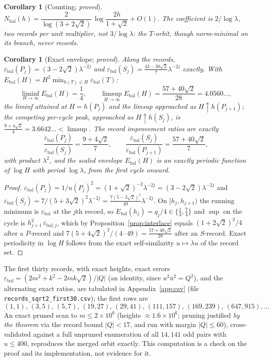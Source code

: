 \documentclass[11pt]{article}
\newtheorem{corollary}[theorem]{Corollary}
\theoremstyle{definition}
\theoremstyle{remark}
\newcommand{\eb}{\varepsilon_{\mathrm{bal}}}
\newcommand{\lam}{\lambda}
\begin{document}
\begin{corollary}[Counting; \emph{proved}]\label{cor:count}
$N_{\mathrm{bal}}(h)=\dfrac{2}{\log(3+2\sqrt2)}\,\log\dfrac{2h}{1+\sqrt2}+O(1)$.
The coefficient is $2/\log\lam$, two records per unit multiplier, not $3/\log\lam$: the $T$-orbit, though norm-minimal on its branch, never records.
\end{corollary}

\begin{corollary}[Exact envelope; \emph{proved}]\label{cor:envelope}
Along the records, $\eb(P_j)=(3-2\sqrt2)\lam^{-2j}$ and $\eb(S_j)=\frac{43-30\sqrt2}{7}\lam^{-2j}$ exactly. With
$E_{\mathrm{bal}}(H)=H^2\min_{h(T)\le H}\eb(T)$:
\[
\liminf_{H\to\infty}E_{\mathrm{bal}}(H)=\frac14,
\qquad
\limsup_{H\to\infty}E_{\mathrm{bal}}(H)=\frac{57+40\sqrt2}{28}=4.0560\dots,
\]
the liminf attained at $H=h(P_j)$ and the limsup approached as $H\uparrow h(P_{j+1})$; the competing per-cycle peak, approached as $H\uparrow h(S_j)$, is $\frac{9+4\sqrt2}{4}=3.6642\dots<\limsup$. The record improvement ratios are exactly
\[
\frac{\eb(P_j)}{\eb(S_j)}=\frac{9+4\sqrt2}{7},
\qquad
\frac{\eb(S_j)}{\eb(P_{j+1})}=\frac{57+40\sqrt2}{7},
\]
with product $\lam^2$, and the scaled envelope $E_{\mathrm{bal}}(H)$ is an exactly periodic function of $\log H$ with period $\log\lam$, from the first cycle onward.
\end{corollary}

\begin{proof}
$\eb(P_j)=1/u(P_j)^2=(1+\sqrt2)^{-2}\lam^{-2j}=(3-2\sqrt2)\lam^{-2j}$ and $\eb(S_j)=7/(5+3\sqrt2)^2\lam^{-2j}=\frac{7(5-3\sqrt2)^2}{49}\lam^{-2j}$. On $[h_j,h_{j+1})$ the running minimum is $\eb$ at the $j$th record, so $E_{\mathrm{bal}}(h_j)=q_j/4\in\{\tfrac14,\tfrac74\}$ and $\sup$ on the cycle is $h_{j+1}^2\,\varepsilon_{\mathrm{bal},j}$, which by Proposition~\ref{prop:interlace} equals $(1+2\sqrt2)^2/4$ after a $P$-record and $7(5+4\sqrt2)^2/(4\cdot49)=\frac{57+40\sqrt2}{28}$ after an $S$-record. Exact periodicity in $\log H$ follows from the exact self-similarity $u\mapsto\lam u$ of the record set.
\end{proof}

The first thirty records, with exact heights, exact errors $\eb=(2m^2+k^2-2mk\sqrt2)/|Q|$ (an identity, since $u^2\bar u^2=Q^2$), and the alternating exact ratios, are tabulated in Appendix~\ref{app:csv} (file \texttt{records\_sqrt2\_first30.csv}); the first rows are
\[
(1,1),\,(3,5),\,(5,7),\,(19,27),\,(29,41),\,(111,157),\,(169,239),\,(647,915),\dots
\]
An exact pruned scan to $m\le2\times10^6$ (heights $\approx1.6\times10^6$; pruning justified \emph{by the theorem} via the record bound $|Q|<17$, and run with margin $|Q|\le60$), cross-validated against a full unpruned enumeration of all $14{,}141$ odd pairs with $u\le400$, reproduces the merged orbit exactly. This computation is a check on the proof and its implementation, not evidence for it.
\end{document}

